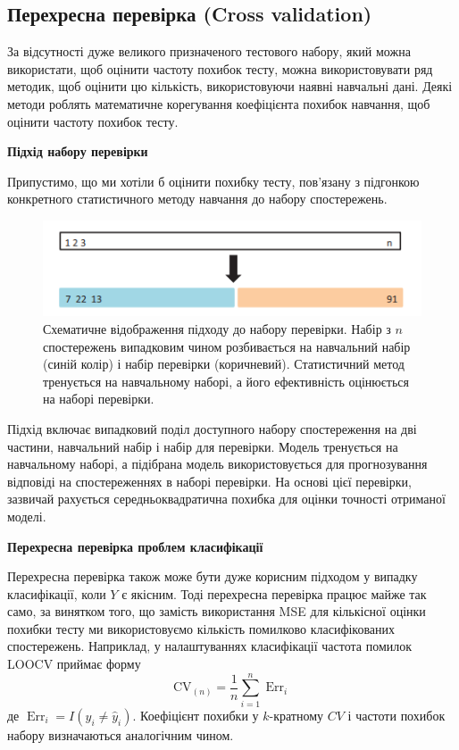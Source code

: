 \documentclass[14pt,a4paper]{extarticle}
\newcounter{e}
\numberwithin{equation}{section}
\numberwithin{figure}{section}
\begin{document}
    \subsection{Перехресна перевірка (Cross validation)} 
    
    За відсутності дуже великого призначеного тестового набору, який можна використати, щоб оцінити частоту похибок тесту, можна використовувати ряд методик, щоб оцінити цю кількість, використовуючи наявні навчальні дані. Деякі методи роблять математичне корегування коефіцієнта похибок навчання, щоб оцінити частоту похибок тесту. \newline
    
    \textbf{Підхід набору перевірки} \newline
    
    Припустимо, що ми хотіли б оцінити похибку тесту, пов’язану з підгонкою конкретного статистичного методу навчання до набору спостережень.
    
	\begin{figure}[h]
		\centering
		\includegraphics[width=0.9 \textwidth]{images/5.png}
		\caption{Схематичне відображення підходу до набору перевірки. Набір з $n$ спостережень випадковим чином розбивається на навчальний набір (синій колір) і набір перевірки (коричневий). Статистичний метод тренується на навчальному наборі, а його ефективність оцінюється на наборі перевірки.}
		\label{fig:5}
	\end{figure}

	Підхід включає випадковий поділ доступного набору спостереження на дві частини, навчальний набір і набір для перевірки. Модель тренується на навчальному наборі, а підібрана модель використовується для прогнозування відповіді на спостереженнях в наборі перевірки. На основі цієї перевірки, зазвичай рахується середньоквадратична похибка для оцінки точності отриманої моделі. \newline
	
	
	\textbf{Перехресна перевірка проблем класифікації} \newline
	
	Перехресна перевірка також може бути дуже корисним підходом у випадку класифікації, коли $Y$ є якісним. Тоді перехресна перевірка працює майже так само, за винятком того, що замість використання MSE для кількісної оцінки похибки тесту ми використовуємо кількість помилково класифікованих спостережень. Наприклад, у налаштуваннях класифікації частота помилок LOOCV приймає форму
	$$
		\mathrm{CV}_{(n)}=\frac{1}{n} \sum_{i=1}^{n} \operatorname{Err}_{i}
	$$
	де $\operatorname{Err}_{i}=I\left(y_{i} \neq \hat{y}_{i}\right)$. Коефіцієнт похибки у $k$-кратному $C V$ і частоти похибок набору визначаються аналогічним чином. \newline
\end{document}
